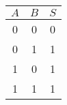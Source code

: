 \documentclass[12pt]{report}
\makeatletter
\newcommand{\Down}{0,-1.5}
\newcommand{\bipolesLength}[1]{#1cm}     %
\newcommand{\setBipolesLength}[1]{
    \renewcommand{\bipolesLength}{#1}
    \ctikzset{bipoles/length=\bipolesLength cm}
}%
\newcommand{\rotate}{0}
\newcommand{\deviceBorderColor}{black}
\newcommand{\deviceBackgroundColor}{white}
\newcommand{\addLogicGate}[7] {
    \raiseMessage{Adding logic gate device [type=#3]}
    \ifthenelse{\equal{\deviceBorderColor}  {black}}
    {\draw (#1)         node (#2) [rotate=\rotate,xshift=0cm,fill=\deviceBackgroundColor,#3 port] {#7}}%
    {\draw (#1)         node (#2) [rotate=\rotate,xshift=0cm,color=\deviceBorderColor,#3 port] {#7}}

    (#2.out)  node      [anchor=south west, yshift=-0.3cm] {#4}
    (#2.in 1) node (A1)     [anchor=east,xshift=0cm,yshift=+0.3cm]       {#5}
    (#2.in 2) node (B1)     [anchor=east,xshift=0cm,yshift=+0.3cm]       {#6};
}
\newenvironment{schema}[1]
{
    \begin{center}
        \makeatletter
        \def\@captype{figure}
        \makeatother
        \newcommand{\TitleSchema}{#1}%
        \raiseMessage{Creating new schema ['#1']}
        \begin{tikzpicture}
    }
    { 
        \end{tikzpicture}
    \end{center}
}
\newenvironment{numeric}[1]
{
\begin{center}
    \makeatletter
    \def\@captype{figure}
    \makeatother
    \newcommand{\TitleNumeric}{#1}%
    \raiseMessage{Creating new chronogram ['#1']}
\begin{tikztimingtable}
}
{
\end{tikztimingtable}%
\caption{\TitleNumeric}
\end{center}
}
\newcommand{\addTransistor}[6] {

    \raiseMessage{Adding transistor device [type=#3]}
    \ifthenelse{\equal{\deviceBorderColor}  {black}}
    {\draw (#1)         node (#2) [xshift=0cm,fill=\deviceBackgroundColor,#3] {}}%
    {\draw (#1)         node (#2) [xshift=0cm,color=\deviceBorderColor,#3] {}}

    (#2.B)  node      [anchor=south west, xshift=0cm, yshift=0cm] {#4} 
    (#2.C) node (A1)     [anchor=north,xshift=0.3cm,yshift=+0.1cm]       {#5}
    (#2.E) node (B1)     [anchor=south,xshift=0.3cm,yshift=0.1cm]       {#6};
}
\newcommand{\orthogonalWireA}{-|}
\newcommand{\orthogonalWireB}{|-}
\newcommand{\addNode}[3] {
    \node (#2) at (#1) {#3};
}%
\newcommand{\addPower}[3] {
    \raiseMessage{Adding power device [name=#2, value=#3]}
    \draw (#1) node (#2) [vcc] {#3};
}%
\newcommand{\addResistor}[4] {
    \raiseMessage{Adding resistor device}
    \draw (#1) to[R,l=$R$] +(#2) #4 (#3);
}%
\newcommand{\setGraphic}{\shorthandoff{:;!?}} %
\newcommand{\setGraphic}{} %
\newcommand{\addPoints}[2]{
    \addplot+[thick,mark=none, color=#1] coordinates{#2};
}
\newcommand{\addLegend}[1]{
    \legend{#1}
}
\makeatother
\begin{document}
\begin{tabular}{|c|c||c|}
          \hline
          $A$& $B$&$S$\\
          \hline
          0 & 0 & 0\\
          \hline
          0 & 1 & 1\\
          \hline
          1 & 0 & 1\\
          \hline
          1 & 1 & 1\\
          \hline
\end{tabular}






\end{document}
